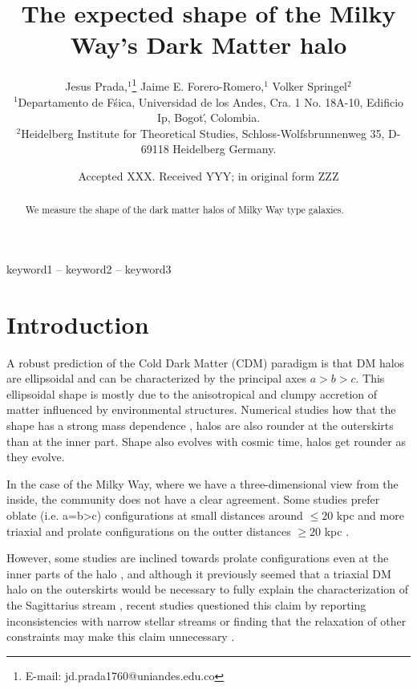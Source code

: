 \documentclass[a4paper,fleqn,usenatbib]{mnras}
\title[Title]{The expected shape of the Milky Way's Dark Matter halo}
\author[Jesus Prada,  Jaime E. Forero-Romero, Volker Springel ]{
Jesus Prada,$^{1}$\thanks{E-mail: jd.prada1760@uniandes.edu.co}
Jaime E. Forero-Romero,$^{1}$
Volker Springel$^{2}$
\\
$^{1}$Departamento de F\'sica, Universidad de los Andes, Cra. 1 No.
18A-10, Edificio Ip, Bogot\', Colombia.\\
$^{2}$Heidelberg Institute for Theoretical Studies, Schloss-Wolfsbrunnenweg 35, D-69118 Heidelberg
Germany.\\
}
\date{Accepted XXX. Received YYY; in original form ZZZ}
\begin{document}
\label{firstpage}
\pagerange{\pageref{firstpage}--\pageref{lastpage}}
\maketitle

\begin{abstract}
We measure the shape of the dark matter halos of Milky Way type galaxies.
\end{abstract}

\begin{keywords}
keyword1 -- keyword2 -- keyword3
\end{keywords}



\section{Introduction}


A robust prediction of the Cold Dark Matter (CDM) paradigm is that DM
halos are ellipsoidal and can be characterized by the principal axes
$a>b>c$.
This ellipsoidal shape is mostly due to the anisotropical and
clumpy accretion of matter influenced by environmental structures. 
Numerical studies how that the shape has a strong mass dependence
\citep{Allgood_et_al._2006}, halos are also rounder at the outerskirts
than at the inner part. Shape also evolves with cosmic time, halos get
rounder as they evolve.  

In the case of the Milky Way, where we have a three-dimensional view
from the inside, the community does not have a clear agreement. 
Some studies prefer oblate (i.e. a=b>c) configurations at small
distances around $\leq 20$ kpc
\citep[see][]{Law_and_Majewski_2010,Bovy_et_el._2016,Loebman_et_al._2012,Olling_and_Merrifield_2000,Banerjee_and_Chanda_2011} 
and more triaxial and prolate configurations on the outter distances
$\geq 20$ kpc 
\citep[see][]{Vera-Ciro_and_Helmi_2013,Law_and_Majewski_2009,Deg_and_Widrow_2013,Banerjee_and_Chanda_2011}.

However, some  studies are inclined towards prolate configurations even at the inner
parts of the halo \citep[see][]{Bowden_et_al._2016}, and
although it previously seemed that a triaxial DM halo on the
outerskirts would be necessary to fully explain the characterization
of the Sagittarius stream \citep{Law_and_Majewski_2009}, recent studies
questioned this claim by reporting inconsistencies with narrow stellar
streams \citet{Pearson_et_al._2015} or finding that
the relaxation of other constraints may make this claim unnecessary
\citet{Ibata_et_al._2013}. 
\end{document}
